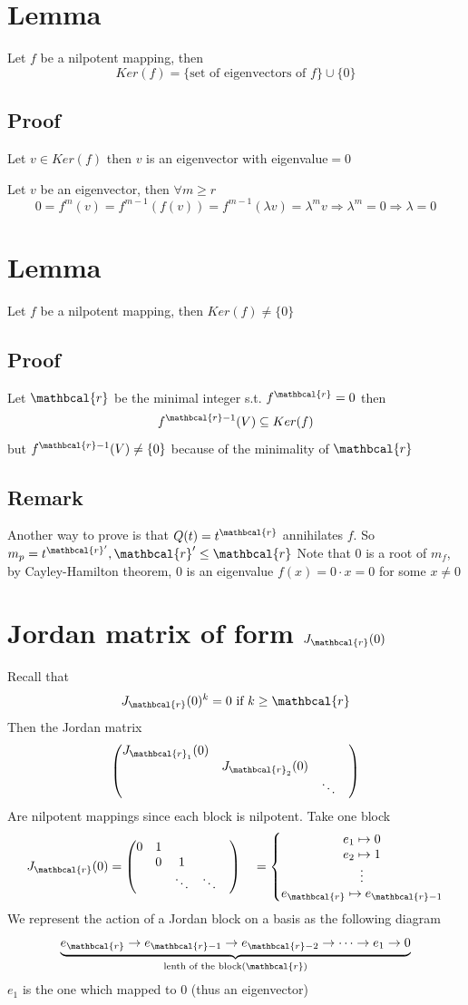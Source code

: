 \documentclass{book}
\begin{document}
\section{Lemma}
Let $f$ be a nilpotent mapping, then $$Ker(f)=\{\text{set of eigenvectors of }f\}\cup\{0\}$$
\subsection*{Proof}
Let $v\in Ker(f)$ then $v$ is an eigenvector with eigenvalue$=0$

Let $v$ be an eigenvector, then $\forall m\geq r$
$$0=f^m(v)=f^{m-1}(f(v))=f^{m-1}(\lambda v)=\lambda^m v\Rightarrow \lambda^m=0\Rightarrow \lambda=0$$
\section{Lemma}
Let $f$ be a nilpotent mapping, then $Ker (f)\neq\{0\}$
\subsection*{Proof}
Let $\mathbcal{r}$ be the minimal integer s.t. $f^\mathbcal{r}=0$ then
$$f^{\mathbcal{r}-1}(V)\subseteq Ker(f)$$
but $f^{\mathbcal{r}-1}(V)\neq\{0\}$ because of the minimality of $\mathbcal{r}$
\subsection*{Remark}
Another way to prove is that $Q(t)=t^\mathbcal{r}$ annihilates $f$. So $m_p=t^{\mathbcal{r}'},\mathbcal{r}'\leq\mathbcal{r}$ Note that 0 is a root of $m_f$, by Cayley-Hamilton theorem, 0 is an eigenvalue $f(x)=0\cdot x=0$ for some $x\neq0$
\section{Jordan matrix of form $J_\mathbcal{r}(0)$}
Recall that $$J_\mathbcal{r}(0)^k=0\text{ if }k\geq \mathbcal{r}$$
Then the Jordan matrix $$\begin{pmatrix}
    J_{\mathbcal{r}_1}(0)&&\\
    &J_{\mathbcal{r}_2}(0)&&\\
    &&\ddots
\end{pmatrix}$$
Are nilpotent mappings since each block is nilpotent. Take one block
$$J_\mathbcal{r}(0)=\begin{pmatrix}
    0&1&&\\
    &0&1&&\\
    &&\ddots&\ddots
\end{pmatrix}\quad=\left\{\begin{matrix}
    e_1\mapsto 0\\e_2\mapsto 1\\\vdots\\e_\mathbcal{r}\mapsto e_{\mathbcal{r}-1}
\end{matrix}\right.$$
We represent the action of a Jordan block on a basis as the following diagram
$$\underbrace{e_\mathbcal{r}\rightarrow e_{\mathbcal{r}-1}\rightarrow e_{\mathbcal{r}-2}\rightarrow \cdots \rightarrow e_1\rightarrow 0}\limits_{\text{lenth of the block}(\mathbcal{r})}$$$e_1$ is the one which mapped to 0 (thus an eigenvector)
\end{document}
